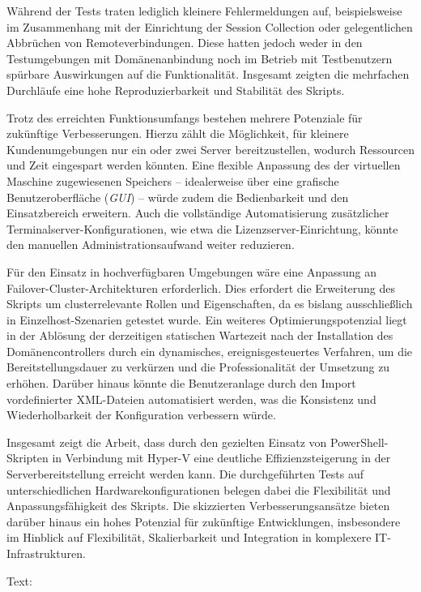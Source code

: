 \documentclass[conference]{IEEEtran}
\begin{document}
Während der Tests traten lediglich kleinere Fehlermeldungen auf, beispielsweise im Zusammenhang mit der Einrichtung der Session Collection oder gelegentlichen Abbrüchen von Remoteverbindungen. Diese hatten jedoch weder in den Testumgebungen mit Domänenanbindung noch im Betrieb mit Testbenutzern spürbare Auswirkungen auf die Funktionalität. Insgesamt zeigten die mehrfachen Durchläufe eine hohe Reproduzierbarkeit und Stabilität des Skripts.

Trotz des erreichten Funktionsumfangs bestehen mehrere Potenziale für zukünftige Verbesserungen. Hierzu zählt die Möglichkeit, für kleinere Kundenumgebungen nur ein oder zwei Server bereitzustellen, wodurch Ressourcen und Zeit eingespart werden könnten. Eine flexible Anpassung des der virtuellen Maschine zugewiesenen Speichers – idealerweise über eine grafische Benutzeroberfläche (\textit{GUI}) – würde zudem die Bedienbarkeit und den Einsatzbereich erweitern. Auch die vollständige Automatisierung zusätzlicher Terminalserver-Konfigurationen, wie etwa die Lizenzserver-Einrichtung, könnte den manuellen Administrationsaufwand weiter reduzieren.

Für den Einsatz in hochverfügbaren Umgebungen wäre eine Anpassung an Failover-Cluster-Architekturen erforderlich. Dies erfordert die Erweiterung des Skripts um clusterrelevante Rollen und Eigenschaften, da es bislang ausschließlich in Einzelhost-Szenarien getestet wurde. Ein weiteres Optimierungspotenzial liegt in der Ablösung der derzeitigen statischen Wartezeit nach der Installation des Domänencontrollers durch ein dynamisches, ereignisgesteuertes Verfahren, um die Bereitstellungsdauer zu verkürzen und die Professionalität der Umsetzung zu erhöhen. Darüber hinaus könnte die Benutzeranlage durch den Import vordefinierter XML-Dateien automatisiert werden, was die Konsistenz und Wiederholbarkeit der Konfiguration verbessern würde.

Insgesamt zeigt die Arbeit, dass durch den gezielten Einsatz von PowerShell-Skripten in Verbindung mit Hyper-V eine deutliche Effizienzsteigerung in der Serverbereitstellung erreicht werden kann. Die durchgeführten Tests auf unterschiedlichen Hardwarekonfigurationen belegen dabei die Flexibilität und Anpassungsfähigkeit des Skripts. Die skizzierten Verbesserungsansätze bieten darüber hinaus ein hohes Potenzial für zukünftige Entwicklungen, insbesondere im Hinblick auf Flexibilität, Skalierbarkeit und Integration in komplexere IT-Infrastrukturen.
\newpage

Text:\\
\end{document}
